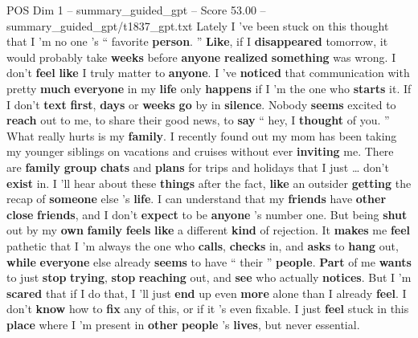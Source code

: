 \begin{textsample}{POS Dim 1 – summary\_guided\_gpt – Score 53.00 – summary\_guided\_gpt/t1837\_gpt.txt}  \label{ex:f1_pos_025}
Lately I ’ve been stuck on this thought that I ’m no one ’s “ favorite \textbf{person}. ” \textbf{Like}, if I \textbf{disappeared} tomorrow, it would probably take \textbf{weeks} before \textbf{anyone} \textbf{realized} \textbf{something} was wrong.
I don't \textbf{feel} \textbf{like} I truly matter to \textbf{anyone}.
I ’ve \textbf{noticed} that communication with pretty \textbf{much} \textbf{everyone} in my \textbf{life} only \textbf{happens} if I ’m the one who \textbf{starts} it.
If I don't \textbf{text} \textbf{first}, \textbf{days} or \textbf{weeks} \textbf{go} by in \textbf{silence}.
Nobody \textbf{seems} excited to \textbf{reach} out to me, to share their good news, to \textbf{say} “ hey, I \textbf{thought} of you. ” What really hurts is my \textbf{family}.
I recently found out my mom has been taking my younger siblings on vacations and cruises without ever \textbf{inviting} me.
There are \textbf{family} \textbf{group} \textbf{chats} and \textbf{plans} for trips and holidays that I just … don't \textbf{exist} in.
I ’ll hear about these \textbf{things} after the fact, \textbf{like} an outsider \textbf{getting} the recap of \textbf{someone} else ’s \textbf{life}.
I can understand that my \textbf{friends} have \textbf{other} \textbf{close} \textbf{friends}, and I don't \textbf{expect} to be \textbf{anyone} ’s number one.
But being \textbf{shut} out by my \textbf{own} \textbf{family} \textbf{feels} \textbf{like} a different \textbf{kind} of rejection.
It \textbf{makes} me \textbf{feel} pathetic that I ’m always the one who \textbf{calls}, \textbf{checks} in, and \textbf{asks} to \textbf{hang} out, \textbf{while} \textbf{everyone} else already \textbf{seems} to have “ their ” \textbf{people}. \textbf{Part} of me \textbf{wants} to just \textbf{stop} \textbf{trying}, \textbf{stop} \textbf{reaching} out, and \textbf{see} who actually \textbf{notices}.
But I ’m \textbf{scared} that if I do that, I ’ll just \textbf{end} up even \textbf{more} alone than I already \textbf{feel}.
I don't \textbf{know} how to \textbf{fix} any of this, or if it ’s even fixable.
I just \textbf{feel} stuck in this \textbf{place} where I ’m present in \textbf{other} \textbf{people} ’s \textbf{lives}, but never essential.

\end{textsample}
